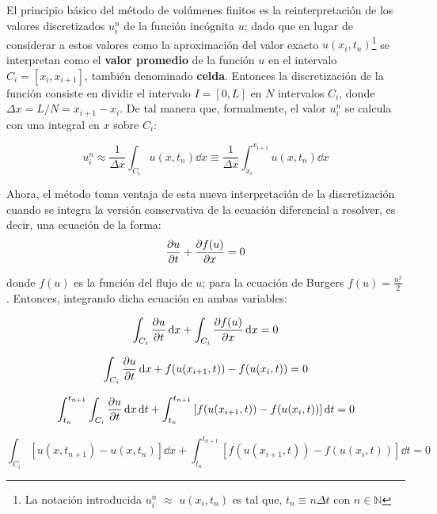 \documentclass[12pt]{article}
\begin{document}
	El principio básico del método de volúmenes finitos es la reinterpretación de los valores discretizados $u_{i}^{n}$ de la función incógnita $u$; dado que en lugar de considerar a estos valores como la aproximación del valor exacto $u(x_{i}, t_{n}) $\footnote{La notación introducida $u_{i}^{n}$ $\approx$ $u(x_{i}, t_{n})$ es tal que, $t_n \equiv n \Delta t $ con $n \in \mathbb{N}$} se interpretan como el \textbf{valor promedio} de la función $u$ en el intervalo $C_{i} = \left[ x_i, x_{i+1} \right]$, también denominado \textbf{celda}. Entonces la discretización de la función consiste en dividir el intervalo $I = [0,L]$ en $N$ intervalos $C_i$, donde $\Delta x = L/N = x_{i+1} - x_i$. De tal manera que, formalmente, el valor $u_{i}^{n}$ se calcula con una integral en $x$ sobre $C_i$:
	
	\begin{equation}
		u_{i}^{n} \approx \frac{1}{\Delta x} \int_{C_i} u(x,t_n) \dd{x} \equiv \frac{1}{\Delta x} \int_{x_i}^{x_{i+1}} u(x,t_n) \dd{x}
		\label{eq:uiapprox}
	\end{equation}
	
	Ahora, el método toma ventaja de esta nueva interpretación de la discretización cuando se integra la versión conservativa de la ecuación diferencial a resolver, es decir, una ecuación de la forma:
	\begin{equation}
		\pdv{u}{t} + \pdv{f(u)}{x} = 0
		\label{eq:conservative_general}
	\end{equation}
	
	donde $f(u)$ es la función del flujo de $u$; para la ecuación de Burgers $f(u) = \frac{u^2}{2}$. Entonces, integrando dicha ecuación en ambas variables:
	
	\begin{equation}
		\int_{C_i} \pdv{u}{t} \dd{x} + \int_{C_i} \pdv{f(u)}{x} \dd{x} = 0
		\label{eq:ecuacion-integrada}
	\end{equation}

	\begin{equation}
		\int_{C_i} \pdv{u}{t} \dd{x} + f(u(x_{i+1} ,t)) - f(u(x_{i},t)) = 0
	\end{equation}

	\begin{equation}
		\int_{t_n}^{t_{n+1}} \int_{C_i} \pdv{u}{t} \dd{x} \dd{t} + \int_{t_n}^{t_{n+1}}\left[ f(u(x_{i+1} ,t)) - f(u(x_{i},t))\right]\dd{t} = 0
	\end{equation}

	\begin{equation}
		\int_{C_i} \left[u(x, t_{n+1}) - u(x, t_n)\right] \dd{x} + \int_{t_n}^{t_{n+1}}\left[ f(u(x_{i+1} ,t)) - f(u(x_{i},t))\right]\dd{t} = 0 
	\end{equation}
	
\end{document}
